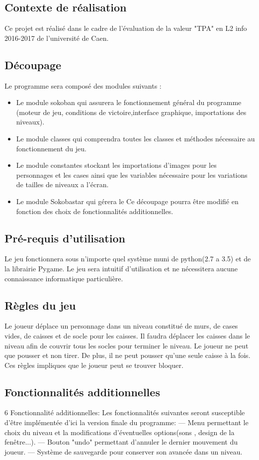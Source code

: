 \documentclass{article}
\begin{document}
		\subsection{Contexte de réalisation}
		Ce projet est réalisé dans le cadre de l’évaluation de la valeur "TPA" en L2 info 2016-2017 de l’université de Caen.
		\subsection{Découpage}
		

		Le programme sera composé des modules suivants :
		\begin{itemize}
\item Le module sokoban qui assurera le fonctionnement général du programme
(moteur de jeu, conditions de victoire,interface graphique, importations
des niveaux).
\item Le module classes qui comprendra toutes les classes et méthodes nécessaire
au fonctionnement du jeu.
\item Le module constantes stockant les importations d’images pour les personnages
et les cases ainsi que les variables nécessaire pour les variations
de tailles de niveaux a l’écran.
\item Le module Sokobastar qui gérera le 
Ce découpage pourra être modifié en fonction des choix de fonctionnalités additionnelles.
		
		\end{itemize}
		\subsection{Pré-requis d'utilisation}
		Le jeu fonctionnera sous n’importe quel système muni de python(2.7 a 3.5) et de la librairie Pygame. Le jeu sera intuitif d’utilisation et ne nécessitera aucune connaissance informatique particulière.
		\subsection{Règles du jeu}
		Le joueur déplace un personnage dans un niveau constitué de murs, de cases
vides, de caisses et de socle pour les caisses. Il faudra déplacer les caisses dans
le niveau afin de couvrir tous les socles pour terminer le niveau. Le joueur ne peut que pousser et non tirer. De plus, il ne peut pousser qu’une seule caisse à la fois. Ces règles impliques que le joueur peut se trouver bloquer.
		\subsection{Fonctionnalités additionnelles}
			6 Fonctionnalité additionnelles: \newline
Les fonctionnalités suivantes seront susceptible d’être implémentée d’ici la
version finale du programme: \newline
— Menu permettant le choix du niveau et la modifications d’éventuelles
options(sons , design de la fenêtre...). \newline
— Bouton "undo" permettant d’annuler le dernier mouvement du joueur. \newline
— Système de sauvegarde pour conserver son avancée dans un niveau. \newline
\end{document}
